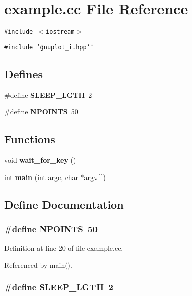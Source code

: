\section{example.cc File Reference}
\label{d2/d80/example_8cc}
{\tt \#include $<$iostream$>$}\par
{\tt \#include \char`\"{}gnuplot\_\-i.hpp\char`\"{}}\par
\subsection*{Defines}
\begin{CompactItemize}
\item 
\#define {\bf SLEEP\_\-LGTH}~2
\item 
\#define {\bf NPOINTS}~50
\end{CompactItemize}
\subsection*{Functions}
\begin{CompactItemize}
\item 
void {\bf wait\_\-for\_\-key} ()
\item 
int {\bf main} (int argc, char $\ast$argv[$\,$])
\end{CompactItemize}


\subsection{Define Documentation}
\subsubsection[{NPOINTS}]{\setlength{\rightskip}{0pt plus 5cm}\#define NPOINTS~50}\label{d2/d80/example_8cc_046c61fd31a06b2051fa0f57e626ee65}




Definition at line 20 of file example.cc.

Referenced by main().
\subsubsection[{SLEEP\_\-LGTH}]{\setlength{\rightskip}{0pt plus 5cm}\#define SLEEP\_\-LGTH~2}\label{d2/d80/example_8cc_86c9f48acee3e4ad980ffbaacc293a1a}




